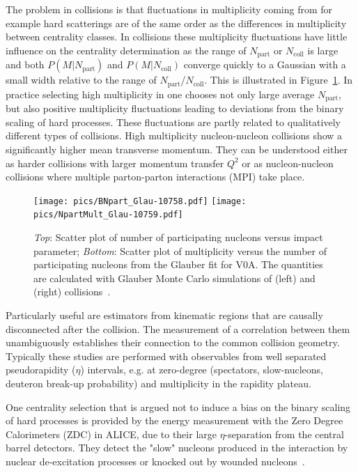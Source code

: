 The problem in \pPb collisions is that fluctuations in multiplicity coming from for example hard scatterings are of the same order as the differences in multiplicity between centrality classes. In \PbPb collisions these multiplicity fluctuations have little influence on the centrality determination as the range of $N_\mathrm{part}$ or $N_\mathrm{coll}$ is large and both $P\left(M|N_\mathrm{part}\right)$ and $P\left(M|N_\mathrm{coll}\right)$ converge quickly to a Gaussian with a small width relative to the range of $N_\mathrm{part}$/$N_\mathrm{coll}$. This is illustrated in Figure~\ref{fig:pPbMult}. In practice selecting high multiplicity in \pPb one chooses not only large average $N_\mathrm{part}$, but also positive multiplicity fluctuations leading to deviations from the binary scaling of hard processes. These fluctuations are partly related to qualitatively different types of collisions. High multiplicity nucleon-nucleon collisions show a significantly higher mean transverse momentum. They can be understood either as harder collisions with larger momentum transfer $Q^2$ or as nucleon-nucleon collisions where multiple parton-parton interactions (MPI) take place. 

\begin{figure}[tb]
\centering
            	\texttt{[image: pics/BNpart\_Glau-10758.pdf]}
            	\texttt{[image: pics/NpartMult\_Glau-10759.pdf]}
                \caption{\emph{Top}: Scatter plot of number of participating nucleons versus impact parameter; \emph{Bottom}: Scatter plot of multiplicity versus the number of participating nucleons from the Glauber fit for V0A. The quantities are calculated with Glauber Monte Carlo simulations of \pPb (left) and \PbPb (right) collisions~\cite{Adam:2014qja}.}
	\label{fig:pPbMult}
\end{figure}

Particularly useful are estimators from kinematic regions that are causally disconnected after the collision. The measurement of a correlation between them unambiguously establishes their connection to the common collision geometry. Typically these studies are performed with observables from well separated pseudorapidity ($\eta$) intervals, e.g. at zero-degree (spectators, slow-nucleons, deuteron break-up probability) and multiplicity in the rapidity plateau.

One centrality selection that is argued not to induce a bias on the binary scaling of hard processes is provided by the energy measurement with the Zero Degree Calorimeters (ZDC) in ALICE, due to their large $\eta$-separation from the central barrel detectors. They detect the "slow" nucleons produced in the interaction by nuclear de-excitation processes or knocked out by wounded nucleons~\cite{Sikler:2003ef}.

